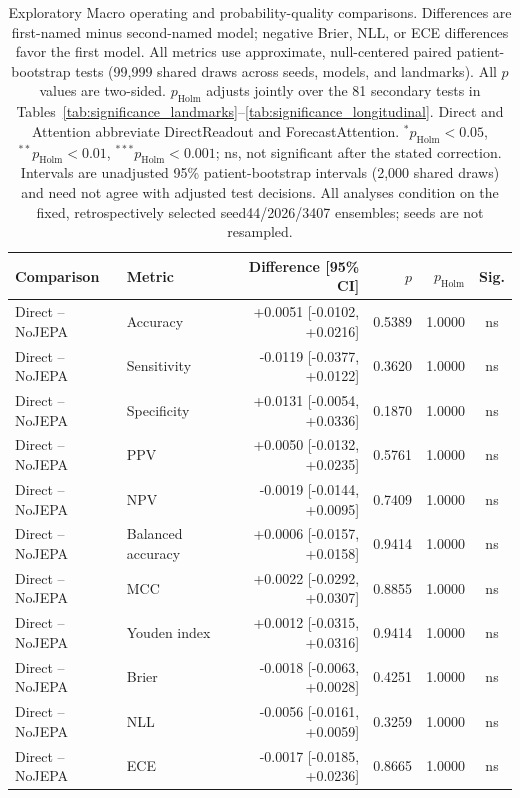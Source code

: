 \begin{table}[t]
\centering
\small
\caption{Exploratory Macro operating and probability-quality comparisons. Differences are first-named minus second-named model; negative Brier, NLL, or ECE differences favor the first model. All metrics use approximate, null-centered paired patient-bootstrap tests (99,999 shared draws across seeds, models, and landmarks). All $p$ values are two-sided. $p_{\mathrm{Holm}}$ adjusts jointly over the 81 secondary tests in Tables~\ref{tab:significance_landmarks}--\ref{tab:significance_longitudinal}. Direct and Attention abbreviate DirectReadout and ForecastAttention. $^{*}p_{\mathrm{Holm}}<0.05$, $^{**}p_{\mathrm{Holm}}<0.01$, $^{***}p_{\mathrm{Holm}}<0.001$; ns, not significant after the stated correction. Intervals are unadjusted 95\% patient-bootstrap intervals (2,000 shared draws) and need not agree with adjusted test decisions. All analyses condition on the fixed, retrospectively selected seed44/2026/3407 ensembles; seeds are not resampled.}
\label{tab:significance_extended}
\begin{tabular}{llrrrc}
\toprule
Comparison & Metric & Difference [95\% CI] & $p$ & $p_{\mathrm{Holm}}$ & Sig. \\
\midrule
Direct -- NoJEPA & Accuracy & +0.0051 [-0.0102, +0.0216] & 0.5389 & 1.0000 & ns \\
Direct -- NoJEPA & Sensitivity & -0.0119 [-0.0377, +0.0122] & 0.3620 & 1.0000 & ns \\
Direct -- NoJEPA & Specificity & +0.0131 [-0.0054, +0.0336] & 0.1870 & 1.0000 & ns \\
Direct -- NoJEPA & PPV & +0.0050 [-0.0132, +0.0235] & 0.5761 & 1.0000 & ns \\
Direct -- NoJEPA & NPV & -0.0019 [-0.0144, +0.0095] & 0.7409 & 1.0000 & ns \\
Direct -- NoJEPA & Balanced accuracy & +0.0006 [-0.0157, +0.0158] & 0.9414 & 1.0000 & ns \\
Direct -- NoJEPA & MCC & +0.0022 [-0.0292, +0.0307] & 0.8855 & 1.0000 & ns \\
Direct -- NoJEPA & Youden index & +0.0012 [-0.0315, +0.0316] & 0.9414 & 1.0000 & ns \\
Direct -- NoJEPA & Brier & -0.0018 [-0.0063, +0.0028] & 0.4251 & 1.0000 & ns \\
Direct -- NoJEPA & NLL & -0.0056 [-0.0161, +0.0059] & 0.3259 & 1.0000 & ns \\
Direct -- NoJEPA & ECE & -0.0017 [-0.0185, +0.0236] & 0.8665 & 1.0000 & ns \\

\end{tabular}
\end{table}
